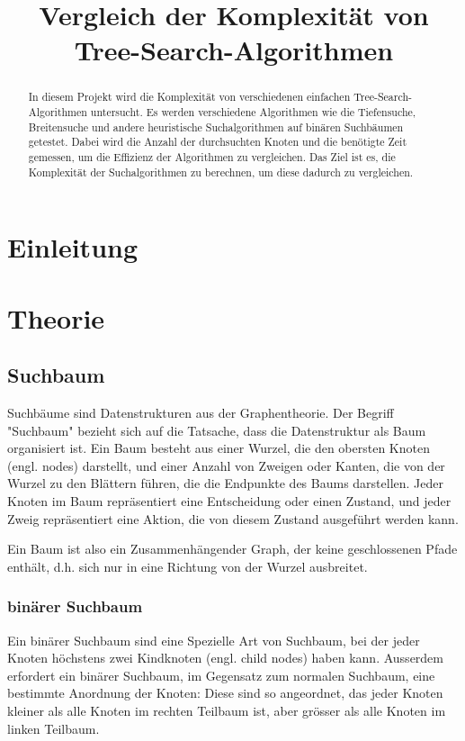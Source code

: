 \documentclass[a4paper,11pt]{article}
\title{Vergleich der Komplexität von \break Tree-Search-Algorithmen}
\author{}
\begin{document}
\maketitle
\thispagestyle{empty}
\pagebreak
{}
\begin{abstract}
In diesem Projekt wird die Komplexität von verschiedenen einfachen Tree-Search-Algorithmen untersucht. Es werden verschiedene Algorithmen wie die Tiefensuche, Breitensuche und andere heuristische Suchalgorithmen auf binären Suchbäumen getestet. Dabei wird die Anzahl der durchsuchten Knoten und die benötigte Zeit gemessen, um die Effizienz der Algorithmen zu vergleichen. Das Ziel ist es, die Komplexität der Suchalgorithmen zu berechnen, um diese dadurch zu vergleichen.
\end{abstract}
\pagebreak
\tableofcontents
\pagebreak

\section{Einleitung}
\cite{c2_algorithms}
\section{Theorie}
\subsection{Suchbaum}
Suchbäume sind Datenstrukturen aus der Graphentheorie. Der Begriff "Suchbaum" bezieht sich auf die Tatsache, dass die Datenstruktur als Baum organisiert ist. Ein Baum besteht aus einer Wurzel, die den obersten Knoten (engl. nodes) darstellt, und einer Anzahl von Zweigen oder Kanten, die von der Wurzel zu den Blättern führen, die die Endpunkte des Baums darstellen. Jeder Knoten im Baum repräsentiert eine Entscheidung oder einen Zustand, und jeder Zweig repräsentiert eine Aktion, die von diesem Zustand ausgeführt werden kann.

Ein Baum ist also ein Zusammenhängender Graph, der keine geschlossenen Pfade enthält\cite{graphs}, d.h. sich nur in eine Richtung von der Wurzel ausbreitet.

\subsubsection{binärer Suchbaum}
Ein binärer Suchbaum sind eine Spezielle Art von Suchbaum, bei der jeder Knoten höchstens zwei Kindknoten (engl. child nodes) haben kann. Ausserdem erfordert ein binärer Suchbaum, im Gegensatz zum normalen Suchbaum, eine bestimmte Anordnung der Knoten: Diese sind so angeordnet, das jeder Knoten kleiner als alle Knoten im rechten Teilbaum ist, aber grösser als alle Knoten im linken Teilbaum.
\end{document}
